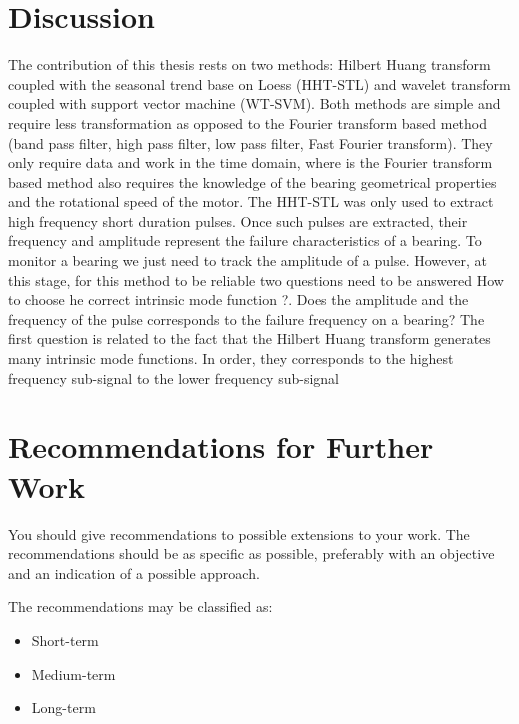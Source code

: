 \documentclass[thesis.tex]{subfiles}
\begin{document}
	
	
	\section{Discussion}
	\label{sec:discussion}
	The contribution of this thesis rests on two methods: Hilbert Huang transform coupled with the seasonal trend base on Loess (HHT-STL) and wavelet transform coupled with support vector machine (WT-SVM). Both methods are simple and require less transformation as opposed to the Fourier transform based method (band pass filter, high pass filter, low pass filter, Fast Fourier transform). They only require data and work in the time domain, where is the Fourier transform based method also requires the knowledge of the bearing geometrical properties and the rotational speed of the motor.
	\justify
	The HHT-STL was only used to extract high frequency short duration pulses. Once such pulses are extracted, their frequency and amplitude represent the failure characteristics of a bearing. To monitor a bearing we just need to track the amplitude of a pulse. However, at this stage, for this method to be reliable two questions need to be answered 
	\justify
	How to choose he correct intrinsic mode function ?. Does the amplitude and the frequency of the pulse corresponds to the failure frequency on a bearing? 
	The first question is related to the fact that the Hilbert Huang transform generates many intrinsic mode functions. In order, they corresponds to the highest frequency sub-signal to the lower frequency sub-signal
	\section{Recommendations for Further Work}
	\label{sec:recommendations_for_further_work}
	You should give recommendations to possible extensions to your work. 
	The recommendations should be as specific as possible, preferably with an objective and an indication of a possible approach.
	
	The recommendations may be classified as:
	\begin{itemize}
		\item Short-term
		\item Medium-term
		\item Long-term
	\end{itemize}
	
\end{document}
